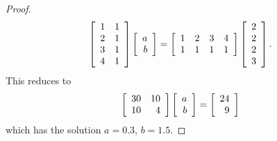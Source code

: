 \documentclass{tutorial}
\begin{document}
\begin{proof}
\[  \left[ \begin{array}{rr}
    1 & 1 \\
    2 & 1 \\
    3 & 1 \\
    4 & 1
  \end{array} \right]
  \left[ \begin{array}{r} a \\ b \end{array} \right]
  = \left[ \begin{array}{rrrr}
    1 & 2 & 3 & 4 \\
    1 & 1 & 1 & 1
  \end{array} \right] \left[ \begin{array}{r}
    2 \\ 2 \\ 2 \\ 3
  \end{array} \right] .  
\]
This reduces to
\[
  \left[ \begin{array}{rr}
    30 & 10 \\
    10 & 4
  \end{array} \right]
  \left[ \begin{array}{r} a \\ b \end{array} \right]
  = \left[ \begin{array}{r}
    24 \\ 9
  \end{array} \right] 
\]
which has the solution $a = 0.3$, $b=1.5$.
\end{proof}\else \newpage \fi
\end{document}
